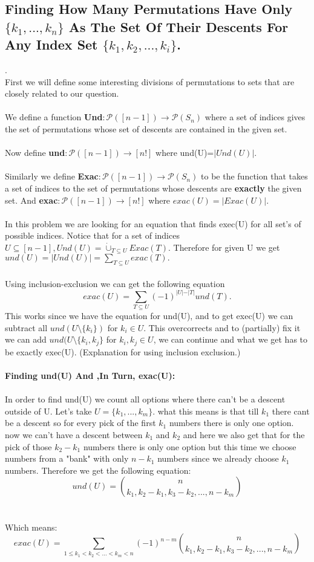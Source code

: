 \documentclass{article}
\begin{document}
\subsection{Finding How Many Permutations Have Only $\{k_1,...,k_n\}$ As The Set Of Their Descents For Any Index Set $\{k_1,k_2,...,k_i\}$.}. \\ 
First we will define some interesting divisions of permutations to sets that are closely related to our question.\\ \\
We define a function \textbf{Und}$: \mathcal{P}([n-1]) \rightarrow \mathcal{P}(S_n)$ where a set of indices gives the set of permutations whose set of descents are contained in the given set.\\ \\ Now define \textbf{und}$: \mathcal{P}([n-1]) \rightarrow [n!]$ where und(U)=$\vert Und(U) \vert$. \\ \\ Similarly we define \textbf{Exac}$: \mathcal{P}([n-1]) \rightarrow \mathcal{P}(S_n)$ to be the function that takes a set of indices to the set of permutations whose descents are \textbf{exactly} the given set. And \textbf{exac}$: \mathcal{P}([n-1]) \rightarrow [n!]$ where $exac(U)=\vert Exac(U)\vert$. \\ \\
In this problem we are looking for an equation that finds exec(U) for all set's of possible indices.
Notice that for a set of indices $U \subseteq [n-1], Und(U) = \dot\cup_{T\subseteq U} Exac(T)$. Therefore for given U we get $und(U)=\vert Und(U)\vert = \sum_{T\subseteq U} exac(T).$ \\ \\ Using inclusion-exclusion we can get the following equation \[exac(U)=\sum_{T\subseteq U} (-1)^{\vert U\vert - \vert T\vert} und(T).\] This works since we have the equation for und(U), and to get exec(U) we can subtract all $und(U\setminus \{k_i\})$ for $k_i\in U$. This overcorrects and to (partially) fix it we can add $und(U\setminus\{k_i,k_j\}$ for $k_i,k_j \in U$, we can continue and what we get has to be exactly exec(U). (Explanation for using inclusion exclusion.)
\\ \\
\textbf{Finding und(U) And ,In Turn, exac(U):}
\\ \\
In order to find und(U) we count all options where there can't be a descent outside of U. Let's take $U=\{k_1,...,k_m\}$. what this means is that till $k_1$ there cant be a descent so for every pick of the first $k_1$ numbers there is only one option. now we can't have a descent between $k_1$ and $k_2$ and here we also get that for the pick of those $k_2-k_1$ numbers there is only one option but this time we choose numbers from a "bank" with only $n-k_1$ numbers since we already choose $k_1$ numbers. Therefore we get the following equation:
\[und(U)={n\choose k_1,k_2-k_1,k_3-k_2,...,n-k_m}\]
\\ \\
Which means: 
\[exac(U)=\sum_{1\leq k_1 < k_2 <...< k_m < n} (-1)^{n-m}{n\choose k_1,k_2-k_1,k_3-k_2,...,n-k_m}\]
\end{document}

